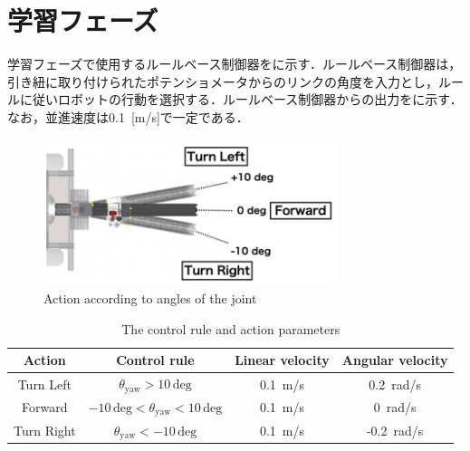 
\section{学習フェーズ}

  学習フェーズで使用するルールベース制御器をに示す．ルールベース制御器は，引き紐に取り付けられたポテンショメータからのリンクの角度を入力とし，ルールに従いロボットの行動を選択する．ルールベース制御器からの出力をに示す．なお，並進速度は0.1 \,[m/s]で一定である．

  \begin{figure}[h]
    \centering
    \includegraphics[keepaspectratio, scale=0.70] {images/okada_rule-based_contoroller.png}
    \caption{Action according to angles of the joint \cite{okada}}
    \label{Fig:okada_rule-based_contoroller}
  \end{figure}

  \begin{table}[ht]
    \caption{The control rule and action parameters}
    \label{tab:actions_control_parameters}
    \centering
    \begin{tabular}{|c|c|c|c|}
    \hline
    \textbf{Action} & \textbf{Control rule} & \textbf{Linear velocity} & \textbf{Angular velocity} \\ 
    \hline
    Turn Left & $\theta_{\mathrm{yaw}} > 10 \, \mathrm{deg}$ & 0.1 \,m/s & 0.2 \,rad/s \\ 
    \hline
    Forward & $-10 \, \mathrm{deg} < \theta_{\mathrm{yaw}} < 10 \, \mathrm{deg}$ & 0.1 \,m/s & 0 \,rad/s \\ 
    \hline
    Turn Right & $\theta_{\mathrm{yaw}} < -10 \, \mathrm{deg}$ & 0.1 \,m/s & -0.2 \,rad/s \\ 
    \hline
    \end{tabular}
    \end{table}
  
\newpage